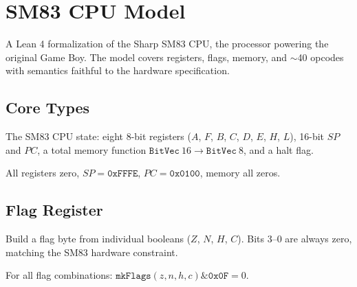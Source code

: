 %

\chapter{SM83 CPU Model}\label{ch:sm83}

A Lean 4 formalization of the Sharp SM83 CPU, the processor powering the original Game Boy.
The model covers registers, flags, memory, and $\sim$40 opcodes with semantics faithful to the hardware specification.

\section{Core Types}

\begin{definition}\label{def:cpu_state}
  \leanok
  The SM83 CPU state: eight 8-bit registers ($A$, $F$, $B$, $C$, $D$, $E$, $H$, $L$),
  16-bit $\mathit{SP}$ and $\mathit{PC}$, a total memory function
  $\texttt{BitVec}\ 16 \to \texttt{BitVec}\ 8$, and a halt flag.
\end{definition}

\begin{definition}\label{def:default_state}
  \leanok
  All registers zero, $\mathit{SP} = \mathtt{0xFFFE}$, $\mathit{PC} = \mathtt{0x0100}$, memory all zeros.
\end{definition}

\section{Flag Register}

\begin{definition}[mkFlags]\label{def:mkflags}
  \leanok
  Build a flag byte from individual booleans ($Z$, $N$, $H$, $C$). Bits 3--0 are always zero,
  matching the SM83 hardware constraint.
\end{definition}

\begin{theorem}\label{thm:mkflags_low_nibble}
  \leanok
  For all flag combinations: $\texttt{mkFlags}(z,n,h,c) \mathbin{\&} \mathtt{0x0F} = 0$.
\end{theorem}

